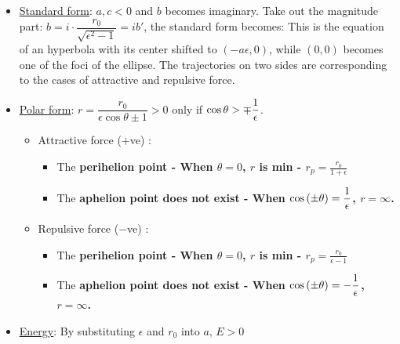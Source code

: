 \documentclass[class=article, crop=false, 12pt]{standalone}
\begin{document}
\begin{itemize}
    \item \ul{Standard form}: $a,c < 0$ and $b$ becomes imaginary. 
    Take out the magnitude part: $b=i\cdot \dfrac{r_0}{\sqrt{\epsilon^2-1}} = ib'$,
    the standard form becomes:
    This is the equation of an hyperbola with its center shifted to $(-a\epsilon,0)$,
    while $(0,0)$ becomes one of the foci of the ellipse.
    The trajectories on two sides are corresponding to the cases of attractive and repulsive force.

    \item \ul{Polar form}: $r=\dfrac{r_0}{\epsilon\cos\theta \pm 1} > 0$ only if $\cos\theta > \mp\dfrac{1}{\epsilon}$.
    \begin{itemize}
        \item Attractive force ($+$ve) : 
        
        \begin{itemize}
            \item The \bf{perihelion} point - When $\theta=0$, $r$ is min - $\boxed{r_p = \frac{r_0}{1+\epsilon}}$
            
            \item The \bf{aphelion} point does not exist - When $\cos\qty(\pm\theta) = \dfrac{1}{\epsilon}$, $r=\infty$.
    
        \end{itemize}

        \item Repulsive force ($-$ve) : 
        \begin{itemize}
            \item The \bf{perihelion} point - When $\theta=0$, $r$ is min - $\boxed{r_p = \frac{r_0}{\epsilon-1}}$
            
            \item The \bf{aphelion} point does not exist - When $\cos\qty(\pm\theta) = -\dfrac{1}{\epsilon}$, $r=\infty$.
    
        \end{itemize}
    \end{itemize}
        

    \item \ul{Energy}: By substituting $\epsilon$ and $r_0$ into $a$, $\boxed{E > 0}$
    

\end{itemize}
\end{document}
